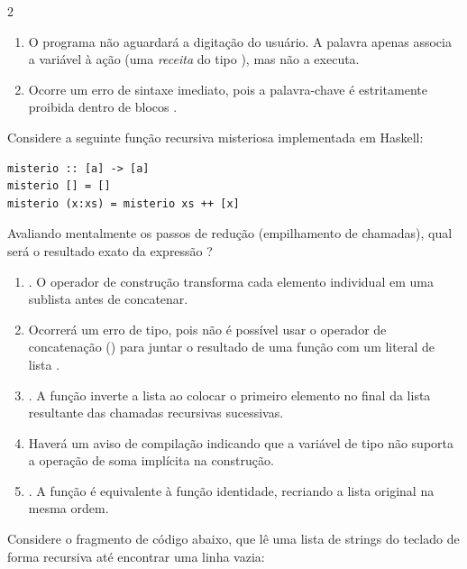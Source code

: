\documentclass[a4paper,10pt,brazil]{article}
\begin{document}
\begin{multicols}{2}
\begin{enumerate}
  \item O programa não aguardará a digitação do usuário. A palavra  apenas associa a variável  à ação (uma \emph{receita} do tipo ), mas não a executa.

  \item Ocorre um erro de sintaxe imediato, pois a palavra-chave  é estritamente proibida dentro de blocos .


\end{enumerate}

Considere a seguinte função recursiva misteriosa implementada em Haskell:

\begin{verbatim}
misterio :: [a] -> [a]
misterio [] = []
misterio (x:xs) = misterio xs ++ [x]
\end{verbatim}

Avaliando mentalmente os passos de redução (empilhamento de chamadas), qual será o resultado exato da expressão ?

\begin{enumerate}
  \item \haskellinline{[[1], [2], [3]]}. O operador de construção transforma cada elemento individual em uma sublista antes de concatenar.

  \item Ocorrerá um erro de tipo, pois não é possível usar o operador de concatenação (\haskellinline{++}) para juntar o resultado de uma função com um literal de lista \haskellinline{[x]}.

  \item \haskellinline{[3, 2, 1]}. A função inverte a lista ao colocar o primeiro elemento no final da lista resultante das chamadas recursivas sucessivas.

  \item Haverá um aviso de compilação indicando que a variável de tipo  não suporta a operação de soma implícita na construção.

  \item \haskellinline{[1, 2, 3]}. A função é equivalente à função identidade, recriando a lista original na mesma ordem.


\end{enumerate}

Considere o fragmento de código abaixo, que lê uma lista de strings do teclado de forma recursiva até encontrar uma linha vazia:


\end{multicols}
\end{document}
